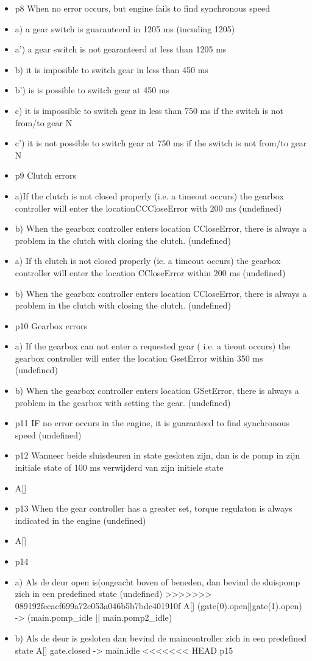 \begin{itemize}
 
\item  p8 When no error occurs, but engine fails to find synchronous speed
\item  a) a gear switch is guaranteerd in 1205 ms (incuding 1205)
\item  a') a gear switch is not gearanteerd at less than 1205 ms
\item  b) it is imposible to switch gear in less than 450 ms
\item  b') is is possible to switch gear at 450 ms
\item  c) it is impossible to switch gear in less than 750 ms if the switch is not from/to gear N
\item  c') it is not possible to switch gear at 750 ms if the switch is not from/to gear N
 
 
\item  p9 Clutch errors
\item  a)If the clutch is not closed properly (i.e. a timeout occurs) the gearbox  controller will enter the locationCCCloseError with 200 ms   (undefined)
\item  b)  When the gearbox controller enters location CCloseError, there is always a problem in the clutch with closing the clutch.  (undefined)
\item  a) If th clutch is not closed properly (ie. a timeout occurs) the gearbox controller will enter the location CCloseError within 200 ms (undefined)
\item  b) When the gearbox controller enters location CCloseError, there is always a problem in the clutch with closing the clutch. (undefined)
 
 
\item  p10 Gearbox errors  
\item  a) If the gearbox can not enter a requested gear ( i.e. a tieout occurs) the gearbox controller will enter the location GsetError within 350 ms (undefined)
\item  b) When the gearbox controller enters location GSetError, there is always a problem in the gearbox with setting the gear. (undefined)
 
 
\item  p11 IF no error occurs in the engine, it is guaranteed to find synchronous speed (undefined)
\item  p12 Wanneer beide sluisdeuren in state gesloten zijn, dan is de pomp in zijn initiale state of 100 ms verwijderd van zijn initiele state
\item  A[]
\item  p13 When the gear controller has a greater set, torque regulaton is always indicated in the engine (undefined)
\item   A[]
\item  p14
\item  a) Als de deur open is(ongeacht boven of beneden, dan bevind de sluispomp zich in een  predefined state (undefined)
>>>>>>> 089192fecacf699a72c053a046b5b7bdc401910f
 A[] (gate(0).open||gate(1).open) -> (main.pomp_idle || main.pomp2_idle)
\item  b) Als de deur is gesloten dan bevind de maincontroller zich in een predefined state
 A[] gate.closed -> main.idle
<<<<<<< HEAD
 p15
 

\end{itemize}
